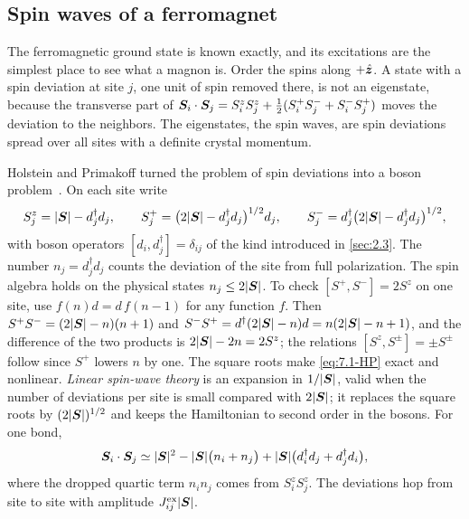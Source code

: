 \subsection{Spin waves of a ferromagnet}

The ferromagnetic ground state is known exactly, and its excitations are the simplest place to see what a magnon is. Order the spins along $+\hat{\bm{z}}$. A state with a spin deviation at site $j$, one unit of spin removed there, is not an eigenstate, because the transverse part of $\bm{S}_i\cdot\bm{S}_j = S^z_iS^z_j + \frac12(S^+_iS^-_j + S^-_iS^+_j)$ moves the deviation to the neighbors. The eigenstates, the spin waves, are spin deviations spread over all sites with a definite crystal momentum.

Holstein and Primakoff turned the problem of spin deviations into a boson problem~\cite{holstein1940field}. On each site write
\begin{equation}
  S^z_j = |\bm{S}| - d^\dagger_jd_j, \qquad
  S^+_j = \bigl(2|\bm{S}| - d^\dagger_jd_j\bigr)^{1/2}d_j, \qquad
  S^-_j = d^\dagger_j\bigl(2|\bm{S}| - d^\dagger_jd_j\bigr)^{1/2} ,
  \label{eq:7.1-HP}
\end{equation}
with boson operators $[d_i, d^\dagger_j] = \delta_{ij}$ of the kind introduced in \cref{sec:2.3}. The number $n_j = d^\dagger_jd_j$ counts the deviation of the site from full polarization. The spin algebra holds on the physical states $n_j \le 2|\bm{S}|$. To check $[S^+, S^-] = 2S^z$ on one site, use $f(n)d = d\,f(n - 1)$ for any function $f$. Then $S^+S^- = (2|\bm{S}| - n)(n + 1)$ and $S^-S^+ = d^\dagger(2|\bm{S}| - n)d = n(2|\bm{S}| - n + 1)$, and the difference of the two products is $2|\bm{S}| - 2n = 2S^z$; the relations $[S^z, S^\pm] = \pm S^\pm$ follow since $S^+$ lowers $n$ by one. The square roots make \cref{eq:7.1-HP} exact and nonlinear. \emph{Linear spin-wave theory} is an expansion in $1/|\bm{S}|$, valid when the number of deviations per site is small compared with $2|\bm{S}|$; it replaces the square roots by $(2|\bm{S}|)^{1/2}$ and keeps the Hamiltonian to second order in the bosons. For one bond,
\begin{equation*}
  \bm{S}_i\cdot\bm{S}_j \simeq |\bm{S}|^2 - |\bm{S}|\bigl(n_i + n_j\bigr) + |\bm{S}|\bigl(d^\dagger_id_j + d^\dagger_jd_i\bigr) ,
\end{equation*}
where the dropped quartic term $n_in_j$ comes from $S^z_iS^z_j$. The deviations hop from site to site with amplitude $J^{\mathrm{ex}}_{ij}|\bm{S}|$.


